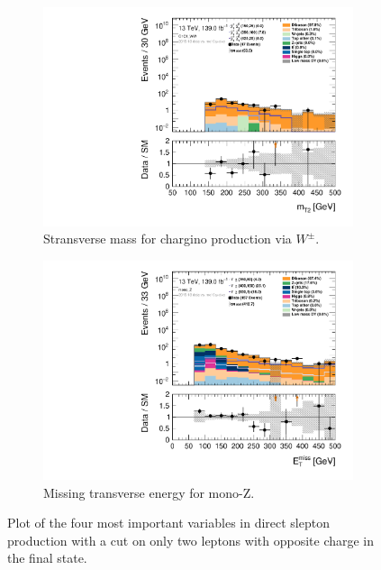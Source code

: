 \begin{figure}[H]
\begin{subfigure}[t!]{0.49\textwidth}
    \label{fig:my_label}
    \end{subfigure}
    \\
    \begin{subfigure}[t!]{0.49\textwidth}
        \includegraphics[width=\textwidth]{Figures/cutandcount/hist1d_mt2_C1C1_WW.pdf}
    \caption{Stransverse mass for chargino production via $W^\pm$.}
    \label{fig:my_label}
    \end{subfigure}
    \begin{subfigure}[t!]{0.49\textwidth}
        \includegraphics[width=\textwidth]{Figures/cutandcount/hist1d_met_Et_mono_Z.pdf}
    \caption{Missing transverse energy for mono-Z.}
    \label{fig:my_label}
    \end{subfigure}
    \caption{Plot of the four most important variables in direct slepton production with a cut on only two leptons with opposite charge in the final state.}
    \label{fig:cutandcountMONA}
\end{figure}
\restoregeometry




